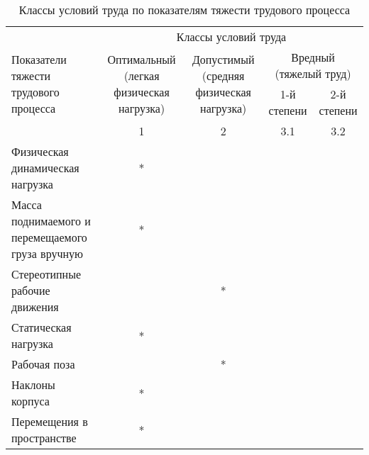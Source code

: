 \begin{table}[h]
    \centering
    \renewcommand{\arraystretch}{1.5}
    \begin{tabular}{|p{3.5cm}|c|c|c|c|}
        \hline
        \multirow{4}{3.5cm}{Показатели тяжести трудового процесса}
        & \multicolumn{4}{c|}{Классы условий труда}                                 \\ \cline{2-5}

        & \multirow{2}{3.8cm}{Оптимальный (легкая физическая нагрузка)}
        & \multirow{2}{3.8cm}{Допустимый (средняя физическая нагрузка)}
        & \multicolumn{2}{c|}{Вредный (тяжелый труд)}                               \\ \cline{4-5}
        & &                                          & 1-й степени & 2-й степени    \\ \cline{2-5}

                                                            & 1 & 2 & 3.1   & 3.2   \\ \hline

        Физическая динамическая нагрузка                    & * &   &       &       \\[1ex] \hline
        Масса поднимаемого и перемещаемого груза вручную    & * &   &       &       \\[1ex] \hline
        Стереотипные рабочие движения                       &   & * &       &       \\[1ex] \hline
        Статическая нагрузка                                & * &   &       &       \\[1ex] \hline
        Рабочая поза                                        &   & * &       &       \\[1ex] \hline
        Наклоны корпуса                                     & * &   &       &       \\[1ex] \hline
        Перемещения в пространстве                          & * &   &       &       \\[1ex] \hline
    \end{tabular}
    \caption{Классы условий труда по показателям тяжести трудового процесса}
    \label{labor_classes_by_work_process_difficulty_tbl}
\end{table}
